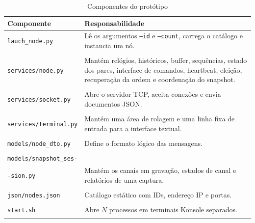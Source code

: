 \begin{table}[H]
    \centering
    \caption{Componentes do protótipo}
    \label{tab:componentes}
    \begin{tabular}{p{5.0 cm} p{10.0cm}}
        \toprule
        \textbf{Componente}           & \textbf{Responsabilidade}                          \\
        \midrule
        \texttt{lauch\_node.py}       & Lê os argumentos \texttt{--id} e
        \texttt{--count}, carrega o catálogo e instancia um nó.                            \\\\

        \texttt{services/node.py}     & Mantém relógios, históricos, buffer,
        sequências, estado dos pares, interface de comandos, heartbeat, eleição,
        recuperação da ordem e coordenação do snapshot.                                    \\\\

        \texttt{services/socket.py}   & Abre o servidor TCP, aceita conexões e envia
        documentos JSON.                                                                   \\\\

        \texttt{services/terminal.py} & Mantém uma área de rolagem e uma linha
        fixa de entrada para a interface textual.                                          \\\\

        \texttt{models/node\_dto.py}  & Define o formato lógico das mensagens.             \\\\

        \texttt{models/snapshot\_ses-}                                                     \\ \texttt{-sion.py} & Mantém os canais em gravação,
        estados de canal e relatórios de uma captura.                                      \\\\

        \texttt{json/nodes.json}      & Catálogo estático com IDs, endereço IP e portas.   \\\\

        \texttt{start.sh}             & Abre $N$ processos em terminais Konsole separados. \\\\

        \bottomrule
    \end{tabular}
\end{table}

